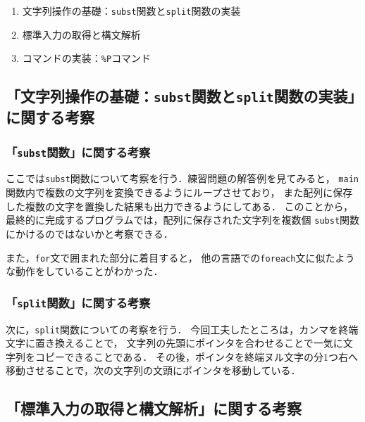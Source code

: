 \documentclass[autodetect-engine,dvi=dvipdfmx,ja=standard,
               a4j,11pt]{bxjsarticle}
\begin{document}
\begin{enumerate}
\setlength{\parskip}{2pt} \setlength{\itemsep}{2pt}
    \item 文字列操作の基礎：\verb|subst|関数と\verb|split|関数の実装
    \item 標準入力の取得と構文解析
    \item コマンドの実装：\verb|%P|コマンド
\end{enumerate}

\subsection{「文字列操作の基礎：\texttt{subst}関数と\texttt{split}関数の実装」に関する考察}

\subsubsection{「\texttt{subst}関数」に関する考察}

ここでは\verb|subst|関数について考察を行う．練習問題の解答例を見てみると，
\verb|main|関数内で複数の文字列を変換できるようにループさせており，
また配列に保存した複数の文字を置換した結果も出力できるようにしてある．
このことから，最終的に完成するプログラムでは，配列に保存された文字列を複数個
\verb|subst|関数にかけるのではないかと考察できる．

また，\verb|for|文で囲まれた部分に着目すると，
他の言語での\verb|foreach|文に似たような動作をしていることがわかった．

\subsubsection{「\texttt{split}関数」に関する考察}

次に，\verb|split|関数についての考察を行う．
今回工夫したところは，カンマを終端文字に置き換えることで，
文字列の先頭にポインタを合わせることで一気に文字列をコピーできることである．
その後，ポインタを終端ヌル文字の分1つ右へ移動させることで，次の文字列の文頭にポインタを移動している．


\subsection{「標準入力の取得と構文解析」に関する考察}
\end{document}
